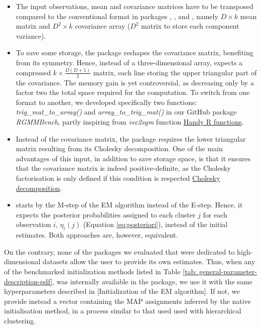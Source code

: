 \begin{itemize}
\item
  The input observations, mean and covariance matrices have to be transposed compared to the conventional format in packages , ,  and , namely \(D \times k\) mean matrix and \(D^2 \times k\) covariance array (\(D^2\) matrix to store each component variance).
\item
  To save some storage, the  package reshapes the covariance matrix, benefiting from its symmetry. Hence, instead of a three-dimensional array,  expects a compressed \(k \times \frac{D(D+1)}{2}\) matrix, each line storing the upper triangular part of the covariance. The memory gain is yet controversial, as decreasing only by a factor two the total space required for the computation. To switch from one format to another, we developed specifically two functions: \emph{trig\_mat\_to\_array()} and \emph{array\_to\_trig\_mat()} in our GitHub package \emph{RGMMBench}, partly inspiring from \emph{vec2sym} function \href{https://rdrr.io/github/patr1ckm/patr1ckm/man/vec2sym.html}{Handy R functions}.
\item
  Instead of the covariance matrix, the  package requires the lower triangular matrix resulting from its Cholesky decomposition. One of the main advantages of this input, in addition to save storage space, is that it ensures that the covariance matrix is indeed positive-definite, as the Cholesky factorisation is only defined if this condition is respected \href{https://en.wikipedia.org/wiki/Cholesky_decomposition}{Cholesky decomposition}.
\item
   starts by the M-step of the EM algorithm instead of the E-step. Hence, it expects the posterior probabilities assigned to each cluster \(j\) for each observation \(i\), \(\eta_i(j)\) (Equation \eqref{eq:posteriori}), instead of the initial estimates. Both approaches are, however, equivalent.
\end{itemize}

\color{blue}

On the contrary, none of the packages we evaluated that were dedicated to high-dimensional datasets allow the user to provide its own estimates. Thus, when any of the benchmarked initialization methods listed in Table \ref{tab: general-parameter-description-pdf}, was internally available in the package, we use it with the same hyperparameters described in {[}Initialization of the EM algorithm{]}. If not, we provide instead a vector containing the MAP assignments inferred by the native initialisation method, in a process similar to that used used with hierarchical clustering.
\color{black}

